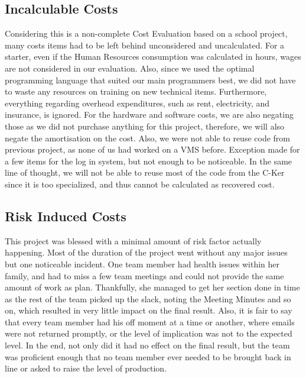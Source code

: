 \documentclass[12pt]{article}
\begin{document}
\subsection{Incalculable Costs}
	Considering this is a non-complete Cost Evaluation based on a school project, many costs items had to be left behind unconsidered and uncalculated. For a starter, even if the Human Resources consumption was calculated in hours, wages are not considered in our evaluation. Also, since we used the optimal programming language that suited our main programmers best, we did not have to waste any resources on training on new technical items. Furthermore, everything regarding overhead expenditures, such as rent, electricity, and insurance, is ignored. For the hardware and software costs, we are also negating those as we did not purchase anything for this project, therefore, we will also negate the amortisation on the cost. Also, we were not able to reuse code from previous project, as none of us had worked on a VMS before. Exception made for a few items for the log in system, but not enough to be noticeable. In the same line of thought, we will not be able to reuse most of the code from the C-Ker since it is too specialized, and thus cannot be calculated as recovered cost.
    
    \clearpage
\subsection{Risk Induced Costs}
	This project was blessed with a minimal amount of risk factor actually happening.  Most of the duration of the project went without any major issues but one noticeable incident. One team member had health issues within her family, and had to miss a few team meetings and could not provide the same amount of work as plan. Thankfully, she managed to get her section done in time as the rest of the team picked up the slack, noting the Meeting Minutes and so on, which resulted in very little impact on the final result. Also, it is fair to say that every team member had his off moment at a time or another, where emails were not returned promptly, or the level of implication was not to the expected level. In the end, not only did it had no effect on the final result, but the team was proficient enough that no team member ever needed to be brought back in line or asked to raise the level of production.


\end{document}
